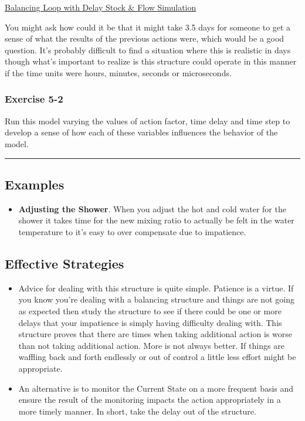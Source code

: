\documentclass[]{memoir}
\begin{document}
\href{http://insightmaker.com/insight/133}{Balancing Loop with Delay
Stock \& Flow Simulation}

You might ask how could it be that it might take 3.5 days for someone to
get a sense of what the results of the previous actions were, which
would be a good question. It's probably difficult to find a situation
where this is realistic in days though what's important to realize is
this structure could operate in this manner if the time units were
hours, minutes, seconds or microseconds.

\subsubsection{Exercise 5-2}

Run this model varying the values of action factor, time delay and time
step to develop a sense of how each of these variables influences the
behavior of the model.

\begin{center}\rule{3in}{0.4pt}\end{center}

\subsection{Examples}

\begin{itemize}
\itemsep1pt\parskip0pt
\item
  \textbf{Adjusting the Shower}. When you adjust the hot and cold water
  for the shower it takes time for the new mixing ratio to actually be
  felt in the water temperature to it's easy to over compensate due to
  impatience.
\end{itemize}

\subsection{Effective Strategies}

\begin{itemize}
\itemsep1pt\parskip0pt
\item
  Advice for dealing with this structure is quite simple. Patience is a
  virtue. If you know you're dealing with a balancing structure and
  things are not going as expected then study the structure to see if
  there could be one or more delays that your impatience is simply
  having difficulty dealing with. This structure proves that there are
  times when taking additional action is worse than not taking
  additional action. More is not always better. If things are waffling
  back and forth endlessly or out of control a little less effort might
  be appropriate.
\item
  An alternative is to monitor the Current State on a more frequent
  basis and ensure the result of the monitoring impacts the action
  appropriately in a more timely manner. In short, take the delay out of
  the structure.
\end{itemize}
\end{document}
